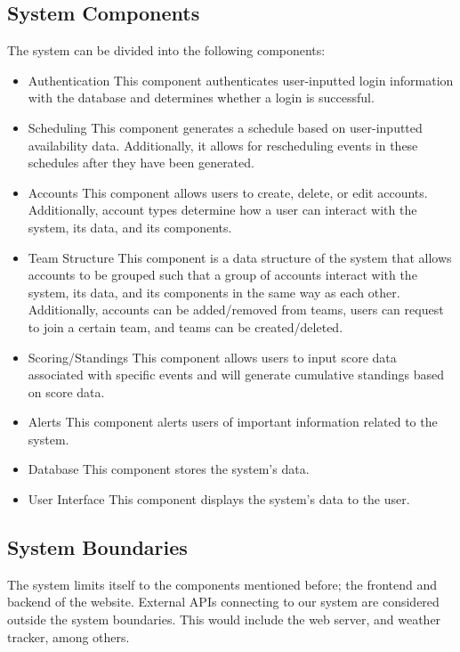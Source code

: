 \documentclass{article}
\begin{document}
\subsection{System Components}
The system can be divided into the following components:
\begin{itemize}
    \item Authentication
    \subitem This component authenticates user-inputted login information with the database
    and determines whether a login is successful.
    \item Scheduling
    \subitem This component generates a schedule based on user-inputted availability data. 
    Additionally, it allows for rescheduling events in these schedules after they 
    have been generated.
    \item Accounts
    \subitem This component allows users to create, delete, or edit accounts. Additionally, account types 
    determine how a user can interact with the system, its data, and its components.
    \item Team Structure
    \subitem This component is a data structure of the system that allows accounts to be grouped 
    such that a group of accounts interact with the system, its data, and its components in the same way as 
    each other. Additionally, accounts can be added/removed from teams, users can request to join a 
    certain team, and teams can be created/deleted.
    \item Scoring/Standings
    \subitem This component allows users to input score data associated with specific events and will 
    generate cumulative standings based on score data.
    \item Alerts
    \subitem This component alerts users of important information related to the system.
    \item Database
    \subitem This component stores the system's data.
    \item User Interface
    \subitem This component displays the system's data to the user.
\end{itemize}

\subsection{System Boundaries}
The system limits itself to the components mentioned before; the frontend and backend of the website.
External APIs connecting to our system are considered outside the system boundaries.
This would include the web server, and weather tracker, among others. 
\end{document}
